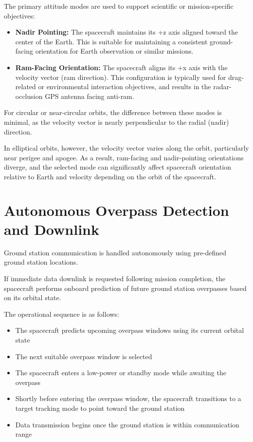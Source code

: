 The primary attitude modes are used to support scientific or mission-specific objectives:

\begin{itemize}
	\item \textbf{Nadir Pointing:} The spacecraft maintains its +z axis aligned toward the center of the Earth. This is suitable for maintaining a consistent ground-facing orientation for Earth observation or similar missions.
	
	\item \textbf{Ram-Facing Orientation:} The spacecraft aligns its +x axis with the velocity vector (ram direction). This configuration is typically used for drag-related or environmental interaction objectives, and results in the radar-occlusion GPS antenna facing anti-ram.
\end{itemize}

For circular or near-circular orbits, the difference between these modes is minimal, as the velocity vector is nearly perpendicular to the radial (nadir) direction.

In elliptical orbits, however, the velocity vector varies along the orbit, particularly near perigee and apogee. As a result, ram-facing and nadir-pointing orientations diverge, and the selected mode can significantly affect spacecraft orientation relative to Earth and velocity depending on the orbit of the spacecraft.

\section{Autonomous Overpass Detection and Downlink}

Ground station communication is handled autonomously using pre-defined ground station locations.

If immediate data downlink is requested following mission completion, the spacecraft performs onboard prediction of future ground station overpasses based on its orbital state.

The operational sequence is as follows:

\begin{itemize}
	\item The spacecraft predicts upcoming overpass windows using its current orbital state
	\item The next suitable overpass window is selected
	\item The spacecraft enters a low-power or standby mode while awaiting the overpass
	\item Shortly before entering the overpass window, the spacecraft transitions to a target tracking mode to point toward the ground station
	\item Data transmission begins once the ground station is within communication range
\end{itemize}

